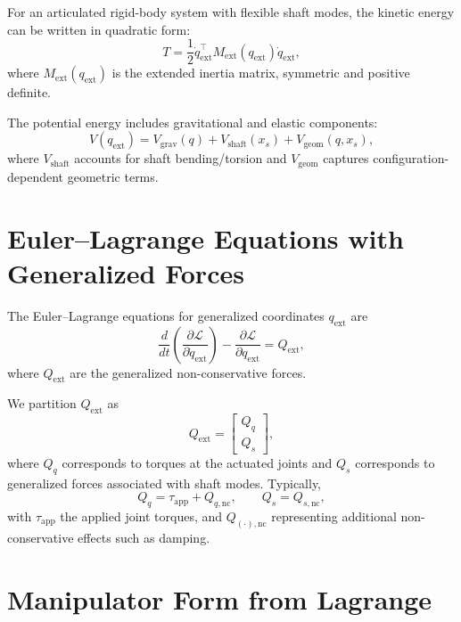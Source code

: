 \documentclass[12pt]{article}
\begin{document}
For an articulated rigid-body system with flexible shaft modes, the kinetic energy can be written in quadratic form:
\begin{equation}
T = \frac{1}{2}\dot{q}_{\mathrm{ext}}^\top M_{\mathrm{ext}}(q_{\mathrm{ext}}) \dot{q}_{\mathrm{ext}},
\end{equation}
where $M_{\mathrm{ext}}(q_{\mathrm{ext}})$ is the extended inertia matrix, symmetric and positive definite.

The potential energy includes gravitational and elastic components:
\begin{equation}
V(q_{\mathrm{ext}}) = V_{\mathrm{grav}}(q) + V_{\mathrm{shaft}}(x_s) + V_{\mathrm{geom}}(q,x_s),
\end{equation}
where $V_{\mathrm{shaft}}$ accounts for shaft bending/torsion and $V_{\mathrm{geom}}$ captures configuration-dependent geometric terms.

\section{Euler--Lagrange Equations with Generalized Forces}

The Euler--Lagrange equations for generalized coordinates $q_{\mathrm{ext}}$ are
\begin{equation}
\frac{d}{dt}\left(\frac{\partial \mathcal{L}}{\partial \dot{q}_{\mathrm{ext}}}\right)
-
\frac{\partial \mathcal{L}}{\partial q_{\mathrm{ext}}}
=
Q_{\mathrm{ext}},
\end{equation}
where $Q_{\mathrm{ext}}$ are the generalized non-conservative forces.

We partition $Q_{\mathrm{ext}}$ as
\begin{equation}
Q_{\mathrm{ext}} =
\begin{bmatrix}
Q_q \\ Q_s
\end{bmatrix},
\end{equation}
where $Q_q$ corresponds to torques at the actuated joints and $Q_s$ corresponds to generalized forces associated with shaft modes. Typically,
\begin{equation}
Q_q = \tau_{\mathrm{app}} + Q_{q,\mathrm{nc}}, \qquad Q_s = Q_{s,\mathrm{nc}},
\end{equation}
with $\tau_{\mathrm{app}}$ the applied joint torques, and $Q_{(\cdot),\mathrm{nc}}$ representing additional non-conservative effects such as damping.

\section{Manipulator Form from Lagrange}
\end{document}

